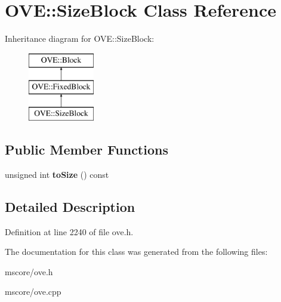 \hypertarget{class_o_v_e_1_1_size_block}{}\section{O\+VE\+:\+:Size\+Block Class Reference}
\label{class_o_v_e_1_1_size_block}
Inheritance diagram for O\+VE\+:\+:Size\+Block\+:\begin{figure}[H]
\begin{center}
\leavevmode
\includegraphics[height=3.000000cm]{class_o_v_e_1_1_size_block}
\end{center}
\end{figure}
\subsection*{Public Member Functions}
\begin{DoxyCompactItemize}
\item 
\mbox{\label{class_o_v_e_1_1_size_block_a650ed74df0cbfcee0a5574026fab8b13}} 
unsigned int {\bfseries to\+Size} () const
\end{DoxyCompactItemize}


\subsection{Detailed Description}


Definition at line 2240 of file ove.\+h.



The documentation for this class was generated from the following files\+:\begin{DoxyCompactItemize}
\item 
mscore/ove.\+h\item 
mscore/ove.\+cpp\end{DoxyCompactItemize}
